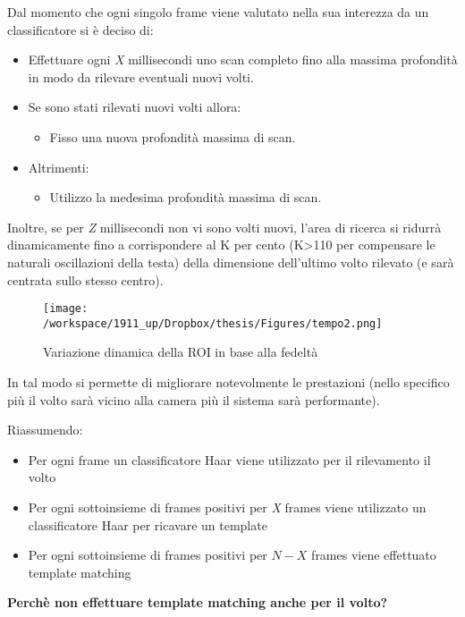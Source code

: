 	Dal momento che ogni singolo frame viene valutato nella sua interezza da un classificatore si è deciso di:

	\begin{itemize}
	\item Effettuare ogni \textit{X} millisecondi uno scan completo fino alla massima profondità in modo da rilevare eventuali nuovi volti.
	\item Se sono stati rilevati nuovi volti allora:
	 	\begin{itemize}
			\item Fisso una nuova profondità massima di scan.
		\end{itemize}
	\item Altrimenti:
		\begin{itemize}
			\item Utilizzo la medesima profondità massima di scan.
		\end{itemize}
	\end{itemize}
	

	Inoltre, se per \textit{Z} millisecondi non vi sono volti nuovi, l'area di ricerca si ridurrà dinamicamente fino a corrispondere al K per cento (K>110 per compensare le naturali oscillazioni della testa) della dimensione dell'ultimo volto rilevato (e sarà centrata sullo stesso centro).
	
			\begin{figure}[H]\centering  
\texttt{[image: /workspace/1911\_up/Dropbox/thesis/Figures/tempo2.png]}
\caption[Variazione dinamica della ROI in base alla fedeltà]{Variazione dinamica della ROI in base alla fedeltà}
\label{pic-a}
\end{figure}
	
	In tal modo si permette di migliorare notevolmente le prestazioni (nello specifico più il volto sarà vicino alla camera più il sistema sarà performante).

	Riassumendo:
	\begin{itemize}
	\item Per ogni frame un classificatore Haar viene utilizzato per il rilevamento il volto
	\item Per ogni sottoinsieme di frames positivi per \textit{X} frames viene utilizzato un classificatore Haar per ricavare un template
	\item Per ogni sottoinsieme di frames positivi per \textit{$N-X$} frames viene effettuato template matching 
	\end{itemize}
	
	\textbf{Perchè non effettuare template matching anche per il volto?}

